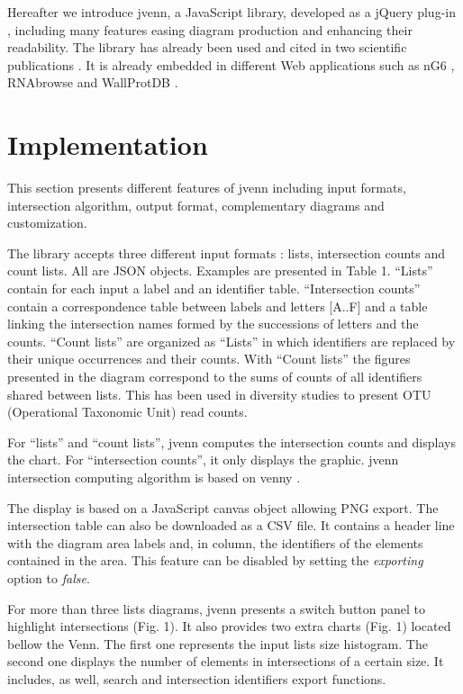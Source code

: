 \documentclass{bmcart}
\begin{document}
Hereafter we introduce jvenn, a JavaScript library, developed as a jQuery
plug-in \cite{jquery}, including many features easing diagram production and
enhancing their readability. The library has already been used and cited in two
scientific publications \cite{Bianchia2013, Aravindraja2013}. It is already
embedded in different Web applications such as nG6 \cite{Mariette2012},
RNAbrowse \cite{Mariette} and WallProtDB \cite{SanClemente}.

\section*{Implementation}

This section presents different features of jvenn including input formats, intersection 
algorithm, output format, complementary diagrams and customization.

The library accepts three different input formats : lists, intersection counts
and count lists. All are JSON objects. Examples are presented in Table 1.
``Lists'' contain for each input a label and an identifier table. ``Intersection
counts'' contain a correspondence table between labels and letters [A..F] and a
table linking the intersection names formed by the successions of letters and
the counts. ``Count lists'' are organized as ``Lists'' in which identifiers are
replaced by their unique occurrences and their counts. With ``Count lists'' the 
figures presented in the diagram correspond to the sums of counts of all
identifiers shared between lists. This has been used in diversity studies to
present OTU (Operational Taxonomic Unit) read counts.

For ``lists'' and ``count lists'', jvenn computes the intersection counts and 
displays the chart. For ``intersection counts'', it only displays the
graphic. jvenn intersection computing algorithm is based on venny \cite{venny}.

The display is based on a JavaScript canvas object allowing PNG export. The 
intersection table can also be downloaded as a CSV file. It contains a header 
line with the diagram area labels and, in column, the identifiers of the
elements contained in the area. This feature can be disabled by setting the 
\textit{exporting} option to \textit{false}.

For more than three lists diagrams, jvenn presents a switch button panel to 
highlight intersections (Fig. 1). It also provides two extra charts (Fig. 1) 
located bellow the Venn. The first one represents the input lists size
histogram. The second one displays the number of elements in intersections of a
certain size. It includes, as well, search and intersection identifiers export 
functions.
\end{document}
